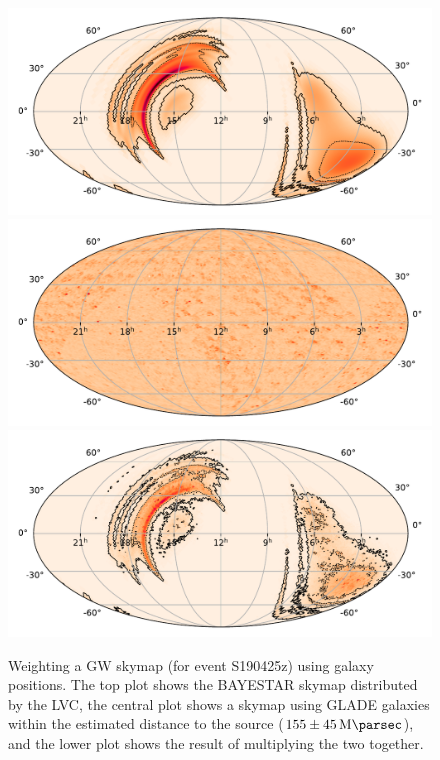 \begin{colsection}
\begin{colsection}
\begin{figure}[p]
    \begin{center}
        \includegraphics[width=0.8\linewidth]{images/tiling/gal_before.pdf}
        \includegraphics[width=0.8\linewidth]{images/tiling/gal.pdf}
        \includegraphics[width=0.8\linewidth]{images/tiling/gal_after.pdf}
    \end{center}
    \caption[Weighting a GW skymap using galaxy positions]{
        Weighting a GW skymap (for event S190425z) using galaxy positions. The top plot shows the BAYESTAR skymap distributed by the LVC, the central plot shows a skymap using GLADE galaxies within the estimated distance to the source ($155\pm\SI{45}{\mega\parsec}$), and the lower plot shows the result of multiplying the two together.
    }\label{fig:galaxy_skymap}
\end{figure}

\end{colsection}



\end{colsection}
